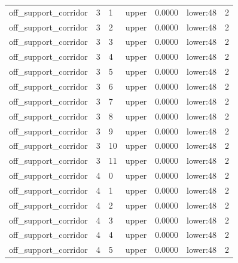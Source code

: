 \documentclass{article}
\begin{document}
\begin{table}[tbp]
{\begin{tabular}{lllllll}
off\_support\_corridor & 3 & 1 & upper & 0.0000 & lower:48 & 2 \\
off\_support\_corridor & 3 & 2 & upper & 0.0000 & lower:48 & 2 \\
off\_support\_corridor & 3 & 3 & upper & 0.0000 & lower:48 & 2 \\
off\_support\_corridor & 3 & 4 & upper & 0.0000 & lower:48 & 2 \\
off\_support\_corridor & 3 & 5 & upper & 0.0000 & lower:48 & 2 \\
off\_support\_corridor & 3 & 6 & upper & 0.0000 & lower:48 & 2 \\
off\_support\_corridor & 3 & 7 & upper & 0.0000 & lower:48 & 2 \\
off\_support\_corridor & 3 & 8 & upper & 0.0000 & lower:48 & 2 \\
off\_support\_corridor & 3 & 9 & upper & 0.0000 & lower:48 & 2 \\
off\_support\_corridor & 3 & 10 & upper & 0.0000 & lower:48 & 2 \\
off\_support\_corridor & 3 & 11 & upper & 0.0000 & lower:48 & 2 \\
off\_support\_corridor & 4 & 0 & upper & 0.0000 & lower:48 & 2 \\
off\_support\_corridor & 4 & 1 & upper & 0.0000 & lower:48 & 2 \\
off\_support\_corridor & 4 & 2 & upper & 0.0000 & lower:48 & 2 \\
off\_support\_corridor & 4 & 3 & upper & 0.0000 & lower:48 & 2 \\
off\_support\_corridor & 4 & 4 & upper & 0.0000 & lower:48 & 2 \\
off\_support\_corridor & 4 & 5 & upper & 0.0000 & lower:48 & 2 \\
\bottomrule
\end{tabular}
}
\end{table}

\clearpage
\end{document}
